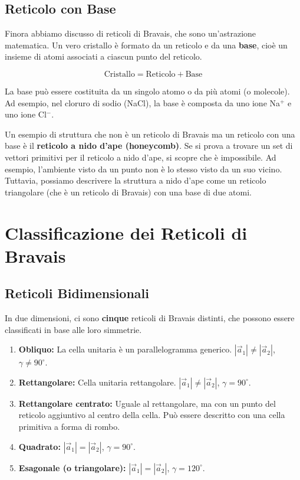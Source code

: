 \subsection{Reticolo con Base}

Finora abbiamo discusso di reticoli di Bravais, che sono un'astrazione matematica. Un vero cristallo è formato da un reticolo e da una \textbf{base}, cioè un insieme di atomi associati a ciascun punto del reticolo.

\begin{equation}
 \text{Cristallo} = \text{Reticolo} + \text{Base}
\end{equation}

La base può essere costituita da un singolo atomo o da più atomi (o molecole). Ad esempio, nel cloruro di sodio (NaCl), la base è composta da uno ione Na$^+$ e uno ione Cl$^-$.

Un esempio di struttura che non è un reticolo di Bravais ma un reticolo con una base è il \textbf{reticolo a nido d'ape (honeycomb)}. Se si prova a trovare un set di vettori primitivi per il reticolo a nido d'ape, si scopre che è impossibile. Ad esempio, l'ambiente visto da un punto non è lo stesso visto da un suo vicino. Tuttavia, possiamo descrivere la struttura a nido d'ape come un reticolo triangolare (che è un reticolo di Bravais) con una base di due atomi.

\section*{Classificazione dei Reticoli di Bravais}

\subsection{Reticoli Bidimensionali}

In due dimensioni, ci sono \textbf{cinque} reticoli di Bravais distinti, che possono essere classificati in base alle loro simmetrie.
\begin{enumerate}
    \item \textbf{Obliquo:} La cella unitaria è un parallelogramma generico. $|\vec{a}_1| \neq |\vec{a}_2|$, $\gamma \neq 90^\circ$.
    \item \textbf{Rettangolare:} Cella unitaria rettangolare. $|\vec{a}_1| \neq |\vec{a}_2|$, $\gamma = 90^\circ$.
    \item \textbf{Rettangolare centrato:} Uguale al rettangolare, ma con un punto del reticolo aggiuntivo al centro della cella. Può essere descritto con una cella primitiva a forma di rombo.
    \item \textbf{Quadrato:} $|\vec{a}_1| = |\vec{a}_2|$, $\gamma = 90^\circ$.
    \item \textbf{Esagonale (o triangolare):} $|\vec{a}_1| = |\vec{a}_2|$, $\gamma = 120^\circ$.
\end{enumerate}

